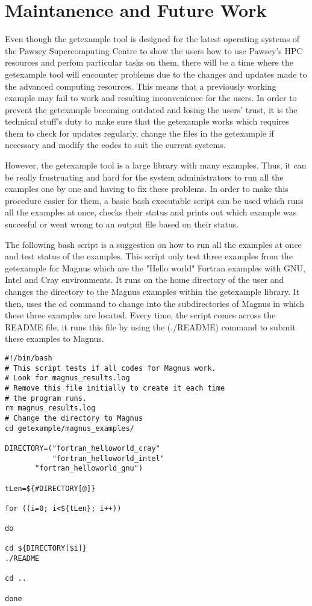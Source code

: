 \documentclass[journal]{IEEEtran}
\begin{document}
  
\section{Maintanence and Future Work}

Even though the getexample tool is designed for the latest operating systems of the Pawsey Supercomputing Centre to show the users how to use
Pawsey's HPC resources and perfom particular tasks on them, there will be a time where the getexample tool will encounter problems due 
to the changes and updates made to the advanced computing resources. This means that a previously working example may fail to work and resulting 
inconvenience for the users. In order to prevent the getexample becoming outdated and losing the users' trust, it is the technical stuff's 
duty to make sure that the getexample works which requires them to check for updates regularly, change the files in the getexample if necessary and 
modify the codes to suit the current systems.

However, the getexample tool is a large library with many examples. Thus, it can be really frustruating and hard for the system administrators to run 
all the examples one by one and having to fix these problems. In order to make this procedure easier for them, a basic bash executable script can be 
used which runs all the examples at once, checks their status and prints out which example was succesful or went wrong to an output file based on their
status.

The following bash script is a suggestion on how to run all the examples at once and test status of the examples. This script only test three examples
from the getexample for Magnus which are the "Hello world" Fortran examples with GNU, Intel and Cray environments. It runs on the home directory of the
user and changes the directory to the Magnus examples within the getexample library. It then, uses the cd command to change into the subdirectories of 
Magnus in which these three examples are located. Every time, the script comes across the README file, it runs this file by using the (./README) command
to submit these examples to Magnus.

\begin{verbatim}
#!/bin/bash
# This script tests if all codes for Magnus work.
# Look for magnus_results.log
# Remove this file initially to create it each time
# the program runs.
rm magnus_results.log  
# Change the directory to Magnus
cd getexample/magnus_examples/

DIRECTORY=("fortran_helloworld_cray" 
           "fortran_helloworld_intel" 
	   "fortran_helloworld_gnu")

tLen=${#DIRECTORY[@]}

for ((i=0; i<${tLen}; i++))

do

cd ${DIRECTORY[$i]}
./README

cd ..

done
\end{verbatim}
\end{document}
